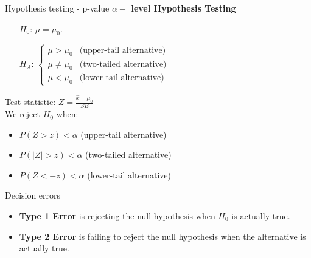 \documentclass[12pt,a4paper]{beamer}
\begin{document}
\begin{frame}{Hypothesis testing - p-value}
	\textbf{$\alpha-$ level Hypothesis Testing}
		\begin{itemize}
		\setlength{\itemsep}{0mm}
		\item[$H_0$:] $\mu = \mu_0$.
		\item[$H_A$:]$\left\{
		\begin{array}{ll}
			\mu>\mu_0& \text{(upper-tail alternative)}\\
			\mu\neq\mu_0& \text{(two-tailed alternative)}\\
			\mu< \mu_0& \text{(lower-tail alternative)}
		\end{array}
		\right.$
	\end{itemize}
	Test statistic: $Z=\frac{\hat{x}-\mu_0}{SE}$\\
	We reject $H_0$ when:
	\begin{itemize}
		\item $P(Z>z)<\alpha$ (upper-tail alternative)
		\item $P(|Z|>z)<\alpha$ (two-tailed alternative)
		\item $P(Z<-z)<\alpha$ (lower-tail alternative)
\end{itemize}
\end{frame}
\begin{frame}{Decision errors}
	
	\begin{table}[ht]
	\centering
		\end{table}
		\small\begin{itemize}
			\item\textbf{Type 1 Error} is rejecting the null hypothesis when $H_0$ is actually true. 
			\item\textbf{Type 2 Error} is failing to reject the null hypothesis when the alternative is actually true.
		\end{itemize}
\end{frame}
\end{document}
